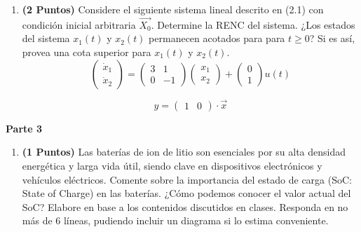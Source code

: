 \begin{enumerate}
    \item \textbf{(2 Puntos)} Considere el siguiente sistema lineal descrito en (2.1) con condición inicial arbitraria $\vec{X_0}$. Determine la RENC del sistema. ¿Los estados del sistema $x_1(t)$ y $x_2(t)$ permanecen acotados para para $t\geq 0$? Si es así, provea una cota superior para $x_1(t)$ y $x_2(t)$.  
    \begin{equation*}
\begin{pmatrix}
\dot{x}_1 \\
\dot{x}_2
\end{pmatrix}
=
\begin{pmatrix}
3 & 1 \\
0 & - 1
\end{pmatrix}
\begin{pmatrix}
x_1 \\
x_2
\end{pmatrix}
+
\begin{pmatrix}
0 \\
1
\end{pmatrix}
u(t) \tag{2.1}
\end{equation*}

    \begin{equation*}
y = \begin{pmatrix}
1 & 0
\end{pmatrix} \cdot  \vec{x}\tag{2.2}
\end{equation*}

\end{enumerate}
 
\textbf{Parte 3}
\begin{enumerate}
    \item \textbf{(1 Puntos)}  Las baterías de ion de litio son esenciales por su alta densidad energética y larga vida útil, siendo clave en dispositivos electrónicos y vehículos eléctricos. Comente sobre la importancia del estado de carga (SoC: State of Charge) en las baterías. ¿Cómo podemos conocer el valor actual del SoC? Elabore en base a los contenidos discutidos en clases. Responda en no más de 6 líneas, pudiendo incluir un diagrama si lo estima conveniente. 
\end{enumerate}
